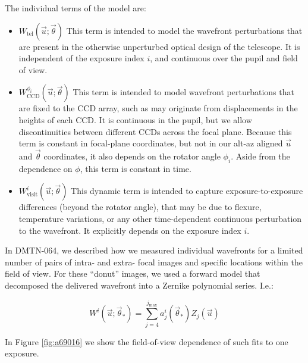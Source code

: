 \documentclass{article}
\begin{document}
The individual terms of the model are:

\begin{itemize}

  \item $W_\mathrm{tel}\left(\vec{u}; \vec{\theta}\right)$  This term is
  intended to model the wavefront perturbations that are present in the
  otherwise unperturbed optical design of the telescope.  It is independent of
  the exposure index $i$, and continuous over the pupil and field of view.

  \item $W_\mathrm{CCD}^{\phi_i}\left(\vec{u}; \vec{\theta}\right)$  This term
  is intended to model wavefront perturbations that are fixed to the CCD array,
  such as may originate from displacements in the heights of each CCD. It is
  continuous in the pupil, but we allow discontinuities between different CCDs
  across the focal plane.  Because this term is constant in focal-plane
  coordinates, but not in our alt-az aligned $\vec{u}$ and $\vec{\theta}$
  coordinates, it also depends on the rotator angle $\phi_i$.  Aside from the
  dependence on $\phi$, this term is constant in time.

  \item $W_\mathrm{visit}^i\left(\vec{u}; \vec{\theta}\right)$  This dynamic
  term is intended to capture exposure-to-exposure differences (beyond the
  rotator angle), that may be due to flexure, temperature variations, or any
  other time-dependent continuous perturbation to the wavefront.  It explicitly
  depends on the exposure index $i$.

\end{itemize}

In DMTN-064, we described how we measured individual wavefronts for a limited
number of pairs of intra- and extra- focal images and specific locations within
the field of view.  For these ``donut'' images, we used a forward model that
decomposed the delivered wavefront into a Zernike polynomial series.  I.e.:

\begin{equation}
    W^i\left(\vec{u}; \vec{\theta}_\ast\right) = \sum_{j=4}^{j_\mathrm{max}} a_j^i(\vec{\theta}_\ast) Z_j(\vec{u})
\end{equation}

In Figure \ref{fig:a69016} we show the field-of-view dependence of such fits to
one exposure.
\end{document}
